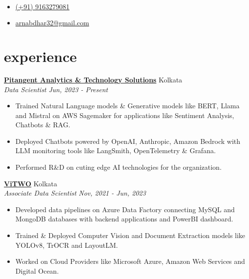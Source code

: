 \documentclass[12pt]{article}
\newcommand{\heading}[2]{\centering{\sffamily\Huge #1}\\\smallskip{\large{#2}}}
\newcommand{\entry}[4]{{{\textbf{#1}}} \hfill #3 \\ #2 \hfill #4}
\begin{document}
\begin{paracol}{2}

\heading{Arnab Dhar}
\switchcolumn

\begin{itemize}[itemsep=1pt,label={}]
  \item \href{https://wa.me/9163279081}{(+91) 9163279081}
  \item \href{mailto:arnabdhar32@gmail.com}{arnabdhar32@gmail.com}
\end{itemize}

\switchcolumn*



\section{experience}

\entry{\href{https://in.linkedin.com/company/pitangent}{Pitangent Analytics \& Technology Solutions}}{\emph{Data Scientist}}{Kolkata}{\emph{Jun, 2023 - Present}}
\begin{itemize}
    \item Trained Natural Language models \& Generative models like BERT, Llama and Mistral on AWS Sagemaker for applications like Sentiment Analysis, Chatbots \& RAG.
    \item Deployed Chatbots powered by OpenAI, Anthropic, Amazon Bedrock with LLM monitoring tools like LangSmith, OpenTelemetry \& Grafana.
    \item Performed R\&D on cuting edge AI technologies for the organization. 
\end{itemize}


\medskip

\entry{\href{https://www.linkedin.com/company/vitwo}{ViTWO}}{\emph{Associate Data Scientist}}{Kolkata}{\emph{Nov, 2021 - Jun, 2023}}
\begin{itemize}
  \item Developed data pipelines on Azure Data Factory connecting MySQL and MongoDB databases with backend applications and PowerBI dashboard.
  \item Trained \& Deployed Computer Vision and Document Extraction models like YOLOv8, TrOCR and LayoutLM.
  \item Worked on Cloud Providers like Microsoft Azure, Amazon Web Services and Digital Ocean.
\end{itemize}


\end{paracol}
\end{document}
